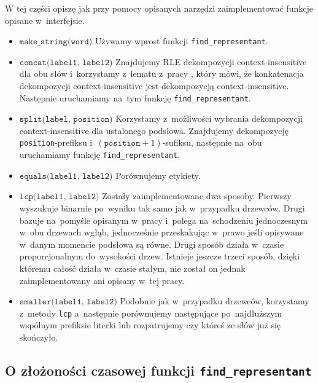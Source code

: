 \documentclass[declaration,shortabstract]{iithesis}
\theoremstyle{definition} \newtheorem{definition}{Definicja}[chapter]
\theoremstyle{plain} \newtheorem{remark}[definition]{Obserwacja}
\theoremstyle{plain} \newtheorem{theorem}[definition]{Twierdzenie}
\theoremstyle{plain} \newtheorem{example}{Przykład}[definition]
\theoremstyle{plain} \newtheorem{lemma}[definition]{Lemat}
\begin{document}
W tej części opiszę jak przy pomocy opisanych narzędzi zaimplementować funkcje opisane w~interfejsie.
\begin{itemize}
    \item $\texttt{make\_string(word)}$ Używamy wprost funkcji \texttt{find\_representant}.
    \item $\texttt{concat(label1, label2)}$ Znajdujemy RLE dekompozycji context-insensitive dla obu słów i~korzystamy z~lematu z~pracy \cite{gawrychowski}, który mówi, że konkatenacja dekompozycji context-insensitive jest dekompozycją context-insensitive. Następnie uruchamiamy na~tym funkcję \texttt{find\_representant}.
    \item $\texttt{split(label, position)}$ Korzystamy z~możliwości wybrania dekompozycji context-insensitive dla ustalonego podsłowa. Znajdujemy dekompozycję \texttt{position}-prefiksu i~$(\texttt{position} + 1)$-sufiksu, następnie na~obu uruchamiamy funkcję \texttt{find\_representant}. 
    \item $\texttt{equals(label1, label2)}$ Porównujemy etykiety.
    \item $\texttt{lcp(label1, label2)}$ Zostały zaimplementowane dwa sposoby. Pierwszy wyszukuje binarnie po~wyniku tak samo jak w~przypadku drzewców. Drugi bazuje na~pomyśle opisanym w~pracy \cite{gawrychowski} i~polega na~schodzeniu jednoczesnym w~obu drzewach wgłąb, jednocześnie przeskakując w~prawo jeśli opisywane w~danym momencie podsłowa są równe. Drugi sposób działa w~czasie proporcjonalnym do~wysokości drzew. Istnieje jeszcze trzeci sposób, dzięki któremu całość działa w~czasie stałym, nie został on jednak zaimplementowany ani opisany w~tej pracy.
    \item $\texttt{smaller(label1, label2)}$ Podobnie jak w~przypadku drzewców, korzystamy z~metody \texttt{lcp} a~następnie porównujemy następujące po~najdłuższym wspólnym prefiksie literki lub rozpatrujemy czy któreś ze słów już się skończyło. 
\end{itemize}


\subsection{O złożoności czasowej funkcji \texttt{find\_representant}}
\end{document}
